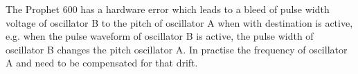 The Prophet 600 has a hardware error which leads to a bleed of pulse width voltage of oscillator B to the pitch of oscillator A when \polymodosc with destination \polymodfreq is active, e.g. when the pulse waveform of oscillator B is active, the pulse width of oscillator B changes the pitch oscillator A. In practise the frequency of oscillator A and \freqfine need to be compensated for that drift.   
